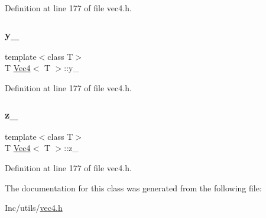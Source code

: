 Definition at line 177 of file vec4.\+h.

\mbox{\label{class_vec4_a567fa1d5ba768bd21ca5e10241b3c3a9}} 
\subsubsection{\texorpdfstring{y\_}{y\_}}
{\footnotesize\ttfamily template$<$class T$>$ \\
T \mbox{\hyperlink{class_vec4}{Vec4}}$<$ T $>$\+::y\+\_\+\hspace{0.3cm}{\ttfamily [private]}}



Definition at line 177 of file vec4.\+h.

\mbox{\label{class_vec4_abca4a20e692727dffbd43c0c46b7d869}} 
\subsubsection{\texorpdfstring{z\_}{z\_}}
{\footnotesize\ttfamily template$<$class T$>$ \\
T \mbox{\hyperlink{class_vec4}{Vec4}}$<$ T $>$\+::z\+\_\+\hspace{0.3cm}{\ttfamily [private]}}



Definition at line 177 of file vec4.\+h.



The documentation for this class was generated from the following file\+:\begin{DoxyCompactItemize}
\item 
Inc/utils/\mbox{\hyperlink{vec4_8h}{vec4.\+h}}\end{DoxyCompactItemize}
